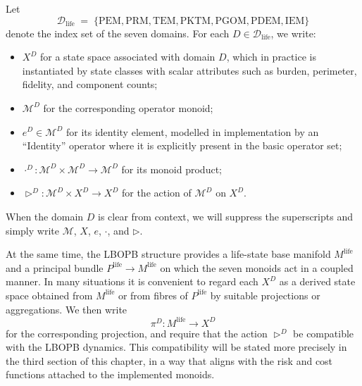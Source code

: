 \documentclass[11pt]{book}
\theoremstyle{plain}
\theoremstyle{definition}
\theoremstyle{remark}
\begin{document}
Let
\[
  \mathcal{D}_{\mathrm{life}}
  \;=\;
  \{\mathrm{PEM}, \mathrm{PRM}, \mathrm{TEM}, \mathrm{PKTM},
    \mathrm{PGOM}, \mathrm{PDEM}, \mathrm{IEM}\}
\]
denote the index set of the seven domains. For each
$D \in \mathcal{D}_{\mathrm{life}}$, we write:
\begin{itemize}
  \item $X^{D}$ for a state space associated with domain $D$, which in
        practice is instantiated by state classes with scalar attributes
        such as burden, perimeter, fidelity, and component counts;
  \item $\mathcal{M}^{D}$ for the corresponding operator monoid;
  \item $e^{D} \in \mathcal{M}^{D}$ for its identity element, modelled
        in implementation by an ``Identity'' operator where it is
        explicitly present in the basic operator set;
  \item $\cdot^{D} \colon \mathcal{M}^{D} \times \mathcal{M}^{D}
        \to \mathcal{M}^{D}$ for its monoid product;
  \item $\triangleright^{D} \colon \mathcal{M}^{D} \times X^{D}
        \to X^{D}$ for the action of $\mathcal{M}^{D}$ on $X^{D}$.
\end{itemize}
When the domain $D$ is clear from context, we will suppress the
superscripts and simply write $\mathcal{M}$, $X$, $e$, $\cdot$, and
$\triangleright$.

At the same time, the LBOPB structure provides a life-state base
manifold $M^{\mathrm{life}}$ and a principal bundle
$P^{\mathrm{life}} \to M^{\mathrm{life}}$ on which the seven monoids
act in a coupled manner. In many situations it is convenient to
regard each $X^{D}$ as a derived state space obtained from
$M^{\mathrm{life}}$ or from fibres of $P^{\mathrm{life}}$ by suitable
projections or aggregations. We then write
\[
  \pi^{D} \colon M^{\mathrm{life}} \longrightarrow X^{D}
\]
for the corresponding projection, and require that the action
$\triangleright^{D}$ be compatible with the LBOPB dynamics. This
compatibility will be stated more precisely in the third section of
this chapter, in a way that aligns with the risk and cost functions
attached to the implemented monoids.
\end{document}
